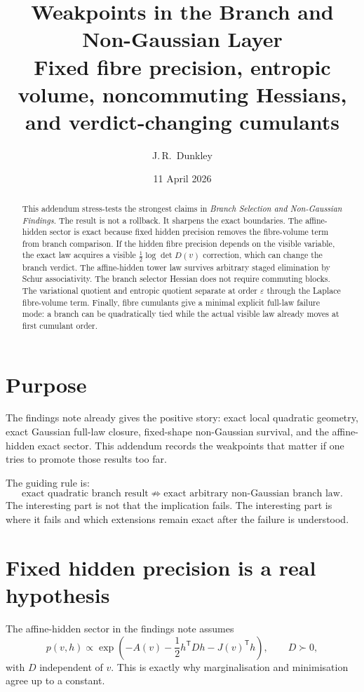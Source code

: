 \documentclass[11pt,a4paper]{article}
\title{\textbf{Weakpoints in the Branch and Non-Gaussian Layer}\\
\large{Fixed fibre precision, entropic volume, noncommuting Hessians, and verdict-changing cumulants}}
\author{J.\,R.~Dunkley}
\date{11 April 2026}
\numberwithin{equation}{section}
\theoremstyle{thmcompact}
\theoremstyle{remark}
\begin{document}
\maketitle

\begin{abstract}
This addendum stress-tests the strongest claims in \emph{Branch Selection and Non-Gaussian Findings}. The result is not a rollback. It sharpens the exact boundaries. The affine-hidden sector is exact because fixed hidden precision removes the fibre-volume term from branch comparison. If the hidden fibre precision depends on the visible variable, the exact law acquires a visible $\frac12\log\det D(v)$ correction, which can change the branch verdict. The affine-hidden tower law survives arbitrary staged elimination by Schur associativity. The branch selector Hessian does not require commuting blocks. The variational quotient and entropic quotient separate at order $\varepsilon$ through the Laplace fibre-volume term. Finally, fibre cumulants give a minimal explicit full-law failure mode: a branch can be quadratically tied while the actual visible law already moves at first cumulant order.
\end{abstract}

\section{Purpose}

The findings note already gives the positive story: exact local quadratic geometry, exact Gaussian full-law closure, fixed-shape non-Gaussian survival, and the affine-hidden exact sector. This addendum records the weakpoints that matter if one tries to promote those results too far.

The guiding rule is:
\[
\text{exact quadratic branch result}
\not\Rightarrow
\text{exact arbitrary non-Gaussian branch law}.
\]
The interesting part is not that the implication fails. The interesting part is where it fails and which extensions remain exact after the failure is understood.

\section{Fixed hidden precision is a real hypothesis}

The affine-hidden sector in the findings note assumes
\[
p(v,h)\propto
\exp\!\left(-A(v)-\frac12h^{\mathsf T}Dh-J(v)^{\mathsf T}h\right),
\qquad D\succ0,
\]
with $D$ independent of $v$. This is exactly why marginalisation and minimisation agree up to a constant.
\end{document}

